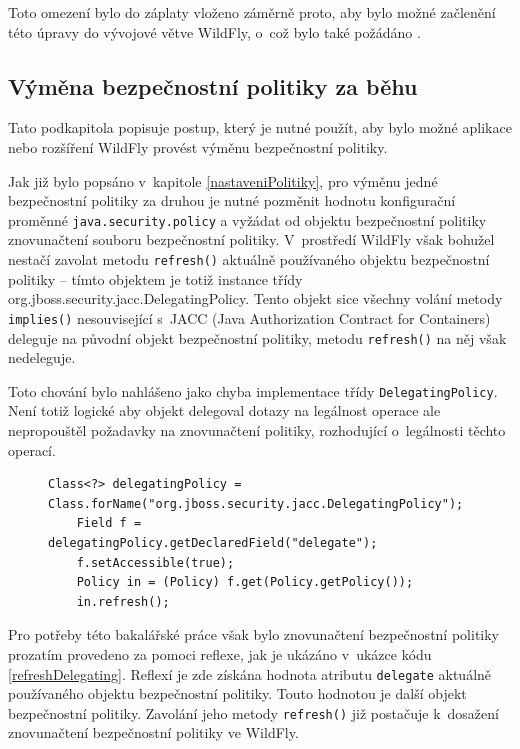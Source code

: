 Toto omezení bylo do záplaty vloženo záměrně proto, aby bylo možné začlenění této úpravy do vývojové větve WildFly, o~což bylo také požádáno \cite{jmPullRequest}.

\subsection{Výměna bezpečnostní politiky za běhu} \label{zmenaZaBehu}

Tato podkapitola popisuje postup, který je nutné použít, aby bylo možné aplikace nebo rozšíření WildFly provést výměnu bezpečnostní politiky.

Jak již bylo popsáno v~kapitole \ref{nastaveniPolitiky}, pro výměnu jedné bezpečnostní politiky za druhou je nutné pozměnit hodnotu konfigurační proměnné
{\tt java.security.policy} a vyžádat od objektu bezpečnostní politiky znovunačtení souboru bezpečnostní politiky.
V~prostředí WildFly však bohužel nestačí zavolat metodu {\tt refresh()} aktuálně používaného objektu bezpečnostní politiky -- tímto objektem je totiž instance třídy {org.jboss.security.jacc.DelegatingPolicy}. Tento objekt sice všechny volání metody {\tt implies()} nesouvisející s~JACC (Java Authorization Contract for Containers) deleguje na původní objekt bezpečnostní politiky, metodu {\tt refresh()} na něj však nedeleguje.

Toto chování bylo nahlášeno jako chyba implementace třídy {\tt DelegatingPolicy}. \cite{issueDelegating} Není totiž logické aby objekt delegoval dotazy na legálnost operace ale nepropouštěl požadavky na znovunačtení politiky, rozhodující o~legálnosti těchto operací.

\begin{figure}[tbh]
\begin{lstlisting}[caption=Znovunačtení bezpečnostní politiky při nastavené {\tt DelegatingPolicy}, label=refreshDelegating]
    Class<?> delegatingPolicy = Class.forName("org.jboss.security.jacc.DelegatingPolicy");
    Field f = delegatingPolicy.getDeclaredField("delegate");
    f.setAccessible(true);
    Policy in = (Policy) f.get(Policy.getPolicy());
    in.refresh();
\end{lstlisting}
\end{figure}

Pro potřeby této bakalářské práce však bylo znovunačtení bezpečnostní politiky prozatím provedeno za pomoci reflexe, jak je ukázáno v~ukázce kódu \ref{refreshDelegating}.
Reflexí je zde získána hodnota atributu {\tt delegate} aktuálně používaného objektu bezpečnostní politiky.
Touto hodnotou je další objekt bezpečnostní politiky. Zavolání jeho metody {\tt refresh()} již postačuje k~dosažení znovunačtení bezpečnostní politiky ve WildFly.

